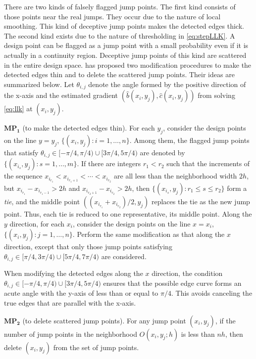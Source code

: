 There are two kinds of falsely flagged jump points. The first kind consists of those points near the real jumps. They occur due to the nature of local smoothing. This kind of deceptive jump points makes the detected edges thick. The second kind exists due to the nature of thresholding in \eqref{eq:stepLLK}. A design point can be flagged as a jump point with a small probability even if it is actually in a continuity region. Deceptive jump points of this kind are scattered in the entire design space. \citet{qiu1997jump} has proposed two modification procedures to make the detected edges thin and to delete the scattered jump points. Their ideas are summarized below. Let \(\theta_{i, j}\) denote the angle formed by the positive direction of the x-axis and the estimated gradient \((\widehat{b}(x_i, y_j), \widehat{c}(x_i, y_j))\) from solving \eqref{eq:llk} at \((x_i, y_j)\).

\(\mathrm{\mathbf{MP}}_\mathbf{1}\) (to make the detected edges thin). For each \(y_j\), consider the design points on the line \(y = y_j\), \(\{(x_i, y_j): i = 1, \ldots, n \}\). Among them, the flagged jump points that satisfy \(\theta_{i, j} \in [-\pi/4, \pi/4) \cup [3\pi/4, 5\pi/4)\) are denoted by \(\{(x_{i_s}, y_j): s = 1, \ldots, m \}\). If there are integers \(r_1 < r_2\) such that the increments of the sequence \(x_{i_{r_1}} < x_{i_{r_1 + 1}} < \cdots < x_{i_{r_2}}\) are all less than the neighborhood width \(2h\), but \(x_{i_{r_1}} - x_{i_{r_1 - 1}} > 2h\) and \(x_{i_{r_2 + 1}} - x_{i_{r_2}} > 2h\), then \(\{(x_{i_s}, y_j): r_1 \leq s \leq r_2 \}\) form a \emph{tie}, and the middle point \(((x_{i_{r_1}} + x_{i_{r_2}})/2, y_j)\) replaces the tie as the new jump point. Thus, each tie is reduced to one representative, its middle point. Along the \(y\) direction, for each \(x_i\), consider the design points on the line \(x = x_i\), \(\{(x_i, y_j): j = 1, \ldots, n  \}\). Perform the same modification as that along the \(x\) direction, except that only those jump points satisfying \(\theta_{i, j} \in [\pi/4, 3\pi/4) \cup [5\pi/4, 7\pi/4)\) are considered.

When modifying the detected edges along the \(x\) direction, the condition \(\theta_{i, j} \in [-\pi/4, \pi/4) \cup [3\pi/4, 5\pi/4)\) ensures that the possible edge curve forms an acute angle with the y-axis of less than or equal to \(\pi/4\). This avoids canceling the true edges that are parallel with the x-axis.

\(\mathrm{\mathbf{MP}}_\mathbf{2}\) (to delete scattered jump points). For any jump point \((x_i, y_j)\), if the number of jump points in the neighborhood \(O(x_i, y_j; h)\) is less than \(nh\), then delete \((x_i, y_j)\) from the set of jump points.

